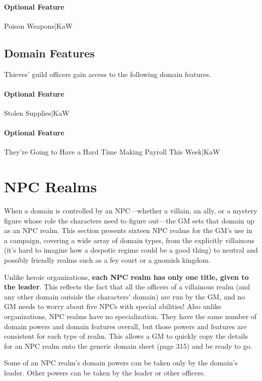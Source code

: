 \documentclass[10pt,a4paper,twoside,bg=print,twocolumn,openany,nodeprecatedcode]{dndbook}
\begin{document}
\paragraph{Optional Feature}
Poison Weapons|KaW

\subsection{Domain Features}
Thieves' guild officers gain access to the following domain features.

\paragraph{Optional Feature}
Stolen Supplies|KaW

\paragraph{Optional Feature}
They're Going to Have a Hard Time Making Payroll This Week|KaW

\section{NPC Realms}
When a domain is controlled by an NPC—whether a villain, an ally, or a mystery figure whose role the characters need to figure out—the GM sets that domain up as an NPC realm. This section presents sixteen NPC realms for the GM's use in a campaign, covering a wide array of domain types, from the explicitly villainous (it's hard to imagine how a despotic regime could be a good thing) to neutral and possibly friendly realms such as a fey court or a gnomish kingdom.

Unlike heroic organizations, \textbf{each NPC realm has only one title, given to the leader}. This reflects the fact that all the officers of a villainous realm (and any other domain outside the characters' domain) are run by the GM, and no GM needs to worry about five NPCs with special abilities! Also unlike organizations, NPC realms have no specialization. They have the same number of domain powers and domain features overall, but those powers and features are consistent for each type of realm. This allows a GM to quickly copy the details for an NPC realm onto the generic domain sheet (page 315) and be ready to go.

Some of an NPC realm's domain powers can be taken only by the domain's leader. Other powers can be taken by the leader or other officers.
\end{document}
